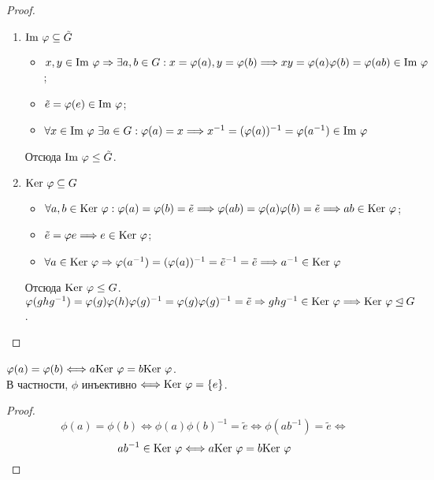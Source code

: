 \begin{proof}\tab
    \begin{enumerate}
        \item $\textup{Im }\phi \subseteq \tilde{G}$
        \begin{itemize}
            \item $x, y \in \textup{Im }\phi \Rightarrow \exists a, b \in G: x = \phi(a), y = \phi(b) \Longrightarrow xy = \phi(a)\phi(b) = \phi(ab) \in \textup{Im }\phi$;
            \item $\tilde{e} = \phi(e) \in \textup{Im }\phi$;
            \item $\forall x \in \textup{Im }\phi \ \exists a \in G: \phi(a) = x \Longrightarrow x^{-1} = (\phi(a))^{-1}= \phi(a^{-1}) \in \textup{Im }\phi$
        \end{itemize}
        Отсюда $\textup{Im } \phi \leq \tilde{G}$.
        \item $\textup{Ker }\phi \subseteq G$
        \begin{itemize}
            \item $\forall a, b \in \textup{Ker }\phi: \phi(a) = \phi(b) = \tilde{e} \Longrightarrow \phi(ab) = \phi(a)\phi(b) = \tilde{e} \Longrightarrow \newline ab \in \textup{Ker }\phi$;
            \item $\tilde{e} = \phi{e} \Longrightarrow e \in \textup{Ker }\phi$;
            \item $\forall a \in \textup{Ker }\phi \Rightarrow \phi(a^{-1}) = (\phi(a))^{-1} = \tilde{e}^{-1} = \tilde{e}  \Longrightarrow a^{-1} \in \textup{Ker }\phi$
        \end{itemize}
        Отсюда $\textup{Ker } \phi \leq G$.\\
        $\phi(ghg^{-1}) = \phi(g)\phi(h)\phi(g)^{-1} = \phi(g)\phi(g)^{-1} = \tilde{e} \Rightarrow ghg^{-1} \in \textup{Ker }\phi \Longrightarrow \textup{Ker }\phi \unlhd G$.
    \end{enumerate}
\end{proof}
\begin{subtheoremnum}
    $\phi(a) = \phi(b) \Longleftrightarrow a \textup{Ker }\phi = b \textup{Ker }\phi$.\\
    В частности, $\phi$ инъективно $\Longleftrightarrow \textup{Ker }\phi = \{e\}$. 
\end{subtheoremnum}
\begin{proof}
    \[\phi(a) = \phi(b) \Longleftrightarrow \phi(a)\phi(b)^{-1} = \tilde{e} \Longleftrightarrow \phi(ab^{-1}) = \tilde{e} \Longleftrightarrow\]
    \[ab^{-1} \in \textup{Ker }\phi \Longleftrightarrow a \textup{Ker }\phi = b \textup{Ker }\phi\]
\end{proof}
